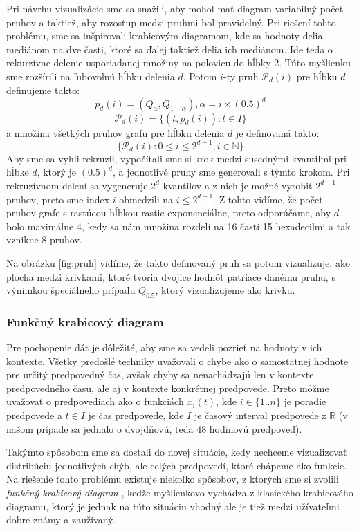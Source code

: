 Pri návrhu vizualizácie sme sa snažili, aby mohol mať diagram variabilný počet pruhov a taktiež, aby rozostup medzi pruhmi bol pravidelný. Pri riešení tohto problému, sme sa inšpirovali krabicovým diagramom, kde sa hodnoty delia mediánom na dve časti, ktoré sa ďalej taktiež delia ich mediánom. Ide teda o rekurzívne delenie usporiadanej množiny na polovicu do hĺbky 2. Túto myšlienku sme rozšírili na ľubovoľnú hĺbku delenia $ d $. Potom $ i $-ty pruh $ \mathcal{P}_{d}(i) $ pre hĺbku $ d $ definujeme takto:
\[
	p_{d}(i) = (Q_{\alpha},Q_{1 - \alpha}) , \alpha = i \times (0.5)^d 	
\]
\[
	\mathcal{P}_{d}(i) = \{ (t,p_{d}(i)) : t \in I \}
\]
a množina všetkých pruhov grafu pre hĺbku delenia $ d $ je definovaná takto:
\[
	\{ \mathcal{P}_{d}(i) : 0 \leq i \leq 2^{d-1} , i \in \mathbb{N} \}
\]
Aby sme sa vyhli rekruzii, vypočítali sme si krok medzi susednými kvantilmi pri hĺbke $ d $, ktorý je $ (0.5)^d $, a jednotlivé pruhy sme generovali s týmto krokom. Pri rekruzívnom delení sa vygeneruje $ 2^d $ kvantilov a z nich je možné vyrobiť $ 2^{d - 1} $ pruhov, preto sme index $ i $ obmedzili na $ i \leq 2^{d-1} $. Z tohto vidíme, že počet pruhov grafe s rastúcou hĺbkou rastie exponenciálne, preto odporúčame, aby $ d $ bolo maximálne 4, kedy sa nám množina rozdelí na 16 častí 15 hexadecilmi a tak vznikne 8 pruhov.

Na obrázku \ref{fig:pruh} vidíme, že takto definovaný pruh sa potom vizualizuje, ako plocha medzi krivkami, ktoré tvoria dvojice hodnôt patriace danému pruhu, s výnimkou špeciálneho prípadu $ Q_{0.5} $, ktorý vizualizujeme ako krivku.





\subsubsection{Funkčný krabicový diagram}
Pre pochopenie dát je dôležité, aby sme sa vedeli pozrieť na hodnoty v ich kontexte. Všetky predošlé techniky uvažovali o chybe ako o samostatnej hodnote pre určitý predpovedný čas, avšak chyby sa nenachádzajú len v kontexte predpovedného času, ale aj v kontexte konkrétnej predpovede. Preto môžme uvažovať o predpovediach ako o funkciách $ x_{i}(t) $, kde $ i \in \{1..n\}$ je poradie predpovede a $ t \in I $ je čas predpovede, kde $ I $ je časový interval predpovede z $ \mathbb{R} $ (v našom prípade sa jednalo o dvojdňovú, teda 48 hodinovú predpoveď).

Takýmto spôsobom sme sa dostali do novej situácie, kedy nechceme vizualizovať distribúciu jednotlivých chýb, ale celých predpovedí, ktoré chápeme ako funkcie. Na riešenie tohto problému existuje niekoľko spôsobov, z ktorých sme si zvolili \textit{funkčný krabicový diagram} \cite{FunctionalBoxplot}, keďže myšlienkovo vychádza z klasického krabicového diagramu, ktorý je jednak na túto situáciu vhodný ale je tiež medzi užívateľmi dobre známy a zaužívaný.

